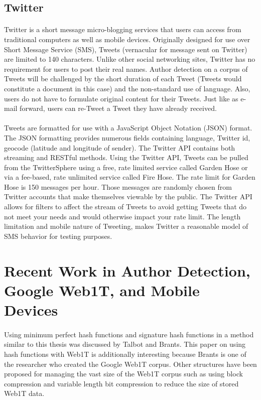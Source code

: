 	\subsection{Twitter}
	\paragraph{} Twitter is a short message micro-blogging services that users can access from traditional computers as well as mobile devices.  Originally designed for use over Short Message Service (SMS), Tweets (vernacular for message sent on Twitter) are limited to 140 characters.  Unlike other social networking sites, Twitter has no requirement for users to post their real names.  Author detection on a corpus of Tweets will be challenged by the short duration of each Tweet (Tweets would constitute a document in this case) and the non-standard use of language.  Also, users do not have to formulate original content for their Tweets.  Just like as e-mail forward, users can re-Tweet a Tweet they have already received.  
	\paragraph{} Tweets are formatted for use with a JavaScript Object Notation (JSON) format. The JSON formatting provides numerous fields containing language, Twitter id, geocode (latitude and longitude of sender).  The Twitter API contains both streaming and RESTful methods.  Using the Twitter API, Tweets can be pulled from the TwitterSphere using a free, rate limited service called Garden Hose or via a fee-based, rate unlimited service called Fire Hose.  The rate limit for Garden Hose is 150 messages per hour.  Those messages are randomly chosen from Twitter accounts that make themselves viewable by the public.  The Twitter API allows for filters to affect the stream of Tweets to avoid getting Tweets that do not meet your needs and would otherwise impact your rate limit.  The length limitation and mobile nature of Tweeting, makes Twitter a reasonable model of SMS behavior for testing purposes.\cite{_streaming_????}

\section{Recent Work in Author Detection, Google Web1T, and Mobile Devices}
	\paragraph{} Using minimum perfect hash functions and signature hash functions in a method similar to this thesis was discussed by Talbot and Brants. \cite{talbot_randomized_2008}  This paper on using hash functions with Web1T is additionally interesting because Brants is one of the researcher who created the Google Web1T corpus.  Other structures have been proposed for managing the vast size of the Web1T corpus such as using block compression and variable length bit compression to reduce the size of stored Web1T data.\cite{watanabe_succinct_2009}
